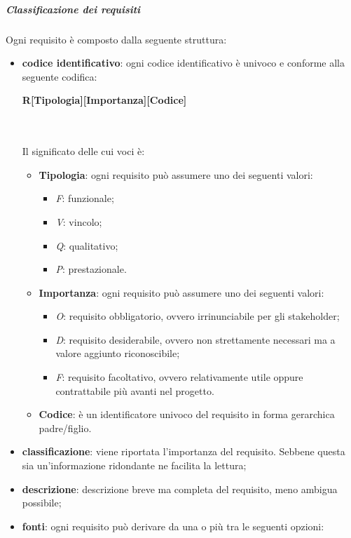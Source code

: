 			\noindent
			\subparagraph{Classificazione dei requisiti}
			Ogni requisito è composto dalla seguente struttura:
			\begin{itemize}
				\item \textbf{codice identificativo}: ogni codice identificativo è univoco e conforme alla seguente codifica: \\
				\centerline{\textbf{R[Tipologia][Importanza][Codice]}} \\ \\
				Il significato delle cui voci è:
				\begin{itemize}					
					\item \textbf{Tipologia}: ogni requisito può assumere uno dei seguenti valori:
					\begin{itemize}
						\item \textit{F}: funzionale;
						\item \textit{V}: vincolo;
						\item \textit{Q}: qualitativo;
						\item \textit{P}: prestazionale.		
					\end{itemize}
				\item \textbf{Importanza}: ogni requisito può assumere uno dei seguenti valori:
				\begin{itemize}
					\item \textit{O}: requisito obbligatorio, ovvero irrinunciabile per gli stakeholder\glo;
					\item \textit{D}: requisito desiderabile, ovvero non strettamente necessari ma a valore aggiunto riconoscibile;
					\item \textit{F}: requisito facoltativo, ovvero relativamente utile oppure contrattabile più avanti nel progetto.	
				\end{itemize}
					\item \textbf{Codice}: è un identificatore univoco del requisito in forma gerarchica padre/figlio.
				\end{itemize}
				\item \textbf{classificazione}: viene riportata l'importanza del requisito. Sebbene questa sia un'informazione ridondante ne facilita la lettura;
				\item \textbf{descrizione}: descrizione breve ma completa del requisito, meno ambigua possibile;
				\item \textbf{fonti}: ogni requisito può derivare da una o più tra le seguenti opzioni:
				\begin{itemize}

\end{itemize}
\end{itemize}
